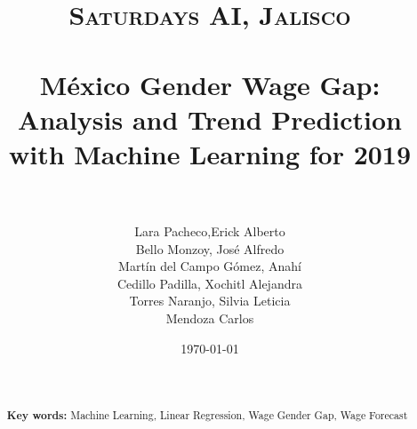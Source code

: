 \documentclass[paper=a4, fontsize=11pt]{scrartcl} %
\title{	
\normalfont \normalsize 
\textsc{Saturdays AI, Jalisco} \\ [25pt] %
\horrule{0.5pt} \\[0.4cm] %
\huge  M\'exico Gender Wage Gap: Analysis and Trend Prediction with Machine Learning for 2019 \\ %
\horrule{2pt} \\[0.5cm] %
}
\author{  Lara Pacheco,Erick Alberto \\ Bello Monzoy, Jos\'e Alfredo \\ Mart\'in del Campo G\'omez, Anah\'i \\ Cedillo Padilla, Xochitl Alejandra \\ Torres Naranjo, Silvia Leticia \\ Mendoza Carlos} %
\date{\normalsize\today} %
\numberwithin{equation}{section} %
\numberwithin{figure}{section} %
\numberwithin{table}{section} %
\begin{document}
\maketitle %

\newpage
\begin{abstract}

{ }\\
 \\

\textbf{Key words:} Machine Learning, Linear Regression, Wage Gender Gap, Wage Forecast
    
\end{abstract}

\newpage
\tableofcontents










\newpage


\end{document}
